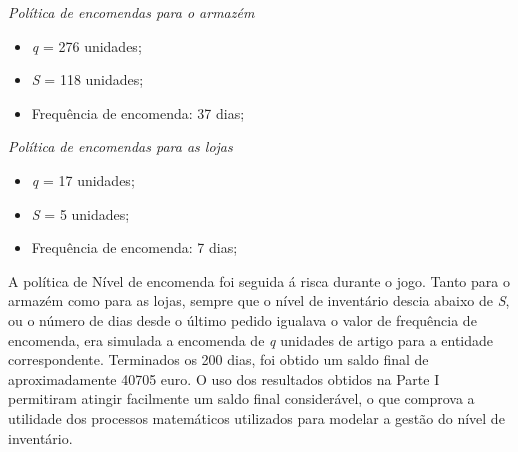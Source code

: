 \begin{itemize}
	\iteam \emph{Política de encomendas para o armazém}
		\begin{itemize}
			\item \emph{q} = 276 unidades;
			\item \emph{S} = 118 unidades;
			\item Frequência de encomenda: 37 dias;
		\end{itemize}
	\iteam \emph{Política de encomendas para as lojas}
		\begin{itemize}
			\item \emph{q} = 17 unidades;
			\item \emph{S} = 5 unidades;
			\item Frequência de encomenda: 7 dias;
		\end{itemize}
\end{itemize}

A política de Nível de encomenda foi seguida á risca durante o jogo. Tanto para o armazém como para as lojas, sempre que o nível de inventário descia abaixo de \emph{S}, ou o número de dias desde o último pedido igualava o valor de frequência de encomenda, era simulada a encomenda de \emph{q} unidades de artigo para a entidade correspondente. Terminados os 200 dias, foi obtido um saldo final de aproximadamente 40705 euro. O uso dos resultados obtidos na Parte I permitiram atingir facilmente um saldo final considerável, o que comprova a utilidade dos processos matemáticos utilizados para modelar a gestão do nível de inventário.




